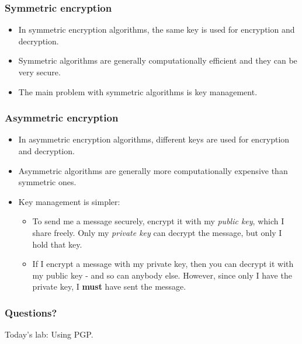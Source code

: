 \documentclass[10pt]{beamer}
\begin{document}
\begin{frame}
  \frametitle{Symmetric encryption}

 \begin{itemize}
  \item In symmetric encryption algorithms, the same key is used
        for encryption and decryption.
  \item Symmetric algorithms are generally computationally efficient 
        and they can be very secure.
  \item The main problem with symmetric algorithms is key management.
  \end{itemize}
\end{frame}

\begin{frame}
  \frametitle{Asymmetric encryption}

 \begin{itemize}
  \item In asymmetric encryption algorithms, different keys are used
        for encryption and decryption.
  \item Asymmetric algorithms are generally more computationally expensive
        than symmetric ones.
  \item Key management is simpler:
        \begin{itemize}
          \item To send me a message securely, encrypt it with my \emph{public                 key}, which I share freely.  Only my \emph{private key} can
                decrypt the message, but only I hold that key.
          \item If I encrypt a message with my private key, then you can
                decrypt it with my public key - and so can anybody else.
                However, since only I have the private key, I \textbf{must}
                have sent the message.
        \end{itemize}
  \end{itemize}
\end{frame}



\begin{frame}
  \frametitle{Questions?}

  Today's lab:  Using PGP.
\end{frame}
\end{document}
